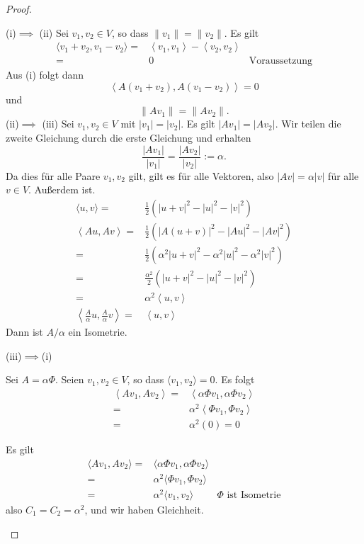 \begin{proof}
	\begin{parts}
	\item 
		(i)$\implies$ (ii)
		Sei $v_1,v_2\in V$, so dass $\|v_1\|=\|v_2\|$. Es gilt
		\begin{align*}
			\langle v_1+v_2, v_1-v_2\rangle=& \left<v_1,v_1 \right>-\left<v_2,v_2 \right>\\
			=&0 & \text{Voraussetzung}
		\end{align*}
Aus (i) folgt dann
\[
\left<A(v_1+v_2),A(v_1-v_2) \right> = 0
\]
und
\[
\|Av_1\|= \|Av_2\|
.\] 
		(ii)$\implies$ (iii)
		Sei $v_1,v_2\in V$ mit $|v_1|=|v_2|$. Es gilt $|A v_1| = |A v_2|$. Wir teilen die zweite Gleichung durch die erste Gleichung und erhalten
		\[
		\frac{|A v_1|}{|v_1|}=\frac{|A v_2|}{|v_2|}:=\alpha
		.\] 
		Da dies f\"{u}r alle Paare $v_1,v_2$ gilt, gilt es f\"{u}r alle Vektoren, also $|Av|=\alpha |v|$ f\"{u}r alle $v\in V$. Außerdem ist.
		\begin{align*}
			\langle u, v\rangle =& \frac{1}{2}\left( |u+v|^2-|u|^2-|v|^2 \right)\\
			\left<Au, Av \right> =&\frac{1}{2}\left( |A(u+v)|^2 - |Au|^2- |Av|^2 \right) \\
			=&\frac{1}{2}(\alpha^2|u+v|^2-\alpha^2|u|^2-\alpha^2|v|^2)\\
			=&\frac{\alpha^2}{2}(|u+v|^2-|u|^2-|v|^2)\\
			=&\alpha^2 \left<u,v \right>\\
			\left<\frac{A}{\alpha}u, \frac{A}{\alpha}v \right> =& \left<u,v \right>	
		\end{align*}
		Dann ist $A / \alpha$ ein Isometrie.

		(iii)$\implies$(i)

		Sei $A=\alpha \Phi$. Seien $v_1,v_2\in V$, so dass $\langle v_1, v_2\rangle=0$. Es folgt
		\begin{align*}
			\left<Av_1, Av_2 \right> =& \left<\alpha\Phi v_1, \alpha\Phi v_2 \right>\\
			=&\alpha^2 \left<\Phi v_1, \Phi v_2 \right>\\
			=&\alpha^2 (0)=0
		\end{align*}
	\item Es gilt
		\begin{align*}
			\langle Av_1, Av_2\rangle =& \langle \alpha \Phi v_1, \alpha\Phi v_2\rangle \\
			=&\alpha^2 \langle \Phi v_1, \Phi v_2\rangle\\
			=&\alpha^2 \langle v_1, v_2\rangle & \Phi\text{ ist Isometrie}
		\end{align*}
		also $C_1=C_2=\alpha^2$, und wir haben Gleichheit.\qedhere
	\end{parts}
\end{proof}
